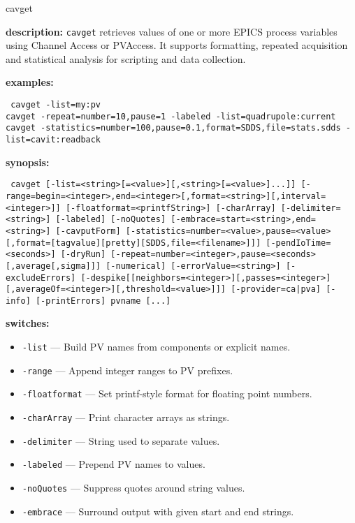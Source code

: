 %
%
\begin{sddsprog}{cavget}
\item \textbf{description:}
\verb+cavget+ retrieves values of one or more EPICS process variables using Channel Access or PVAccess.
It supports formatting, repeated acquisition and statistical analysis for scripting and data collection.
\item \textbf{examples:}
\begin{flushleft}{\tt
cavget -list=my:pv\\
cavget -repeat=number=10,pause=1 -labeled -list=quadrupole:current\\
cavget -statistics=number=100,pause=0.1,format=SDDS,file=stats.sdds -list=cavit:readback
}\end{flushleft}
\item \textbf{synopsis:}
\begin{flushleft}{\tt
cavget [-list=<string>[=<value>][,<string>[=<value>]...]]\
[-range=begin=<integer>,end=<integer>[,format=<string>][,interval=<integer>]]\
[-floatformat=<printfString>] [-charArray] [-delimiter=<string>] [-labeled]\
[-noQuotes] [-embrace=start=<string>,end=<string>] [-cavputForm]\
[-statistics=number=<value>,pause=<value>[,format=[tagvalue][pretty][SDDS,file=<filename>]]]\
[-pendIoTime=<seconds>] [-dryRun] [-repeat=number=<integer>,pause=<seconds>[,average[,sigma]]]\
[-numerical] [-errorValue=<string>] [-excludeErrors]\
[-despike[[neighbors=<integer>][,passes=<integer>][,averageOf=<integer>][,threshold=<value>]]]\
[-provider={ca|pva}] [-info] [-printErrors] pvname [...]
}\end{flushleft}
\item \textbf{switches:}
  \begin{itemize}
    \item {\tt -list} --- Build PV names from components or explicit names.
    \item {\tt -range} --- Append integer ranges to PV prefixes.
    \item {\tt -floatformat} --- Set printf-style format for floating point numbers.
    \item {\tt -charArray} --- Print character arrays as strings.
    \item {\tt -delimiter} --- String used to separate values.
    \item {\tt -labeled} --- Prepend PV names to values.
    \item {\tt -noQuotes} --- Suppress quotes around string values.
    \item {\tt -embrace} --- Surround output with given start and end strings.

\end{itemize}
\end{sddsprog}
